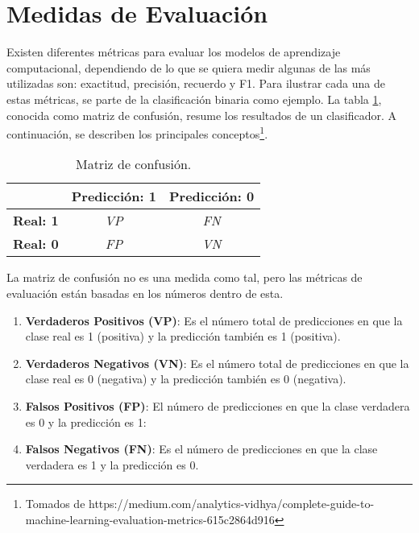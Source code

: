 \section{Medidas de Evaluación}

Existen diferentes métricas para evaluar los modelos de aprendizaje computacional, dependiendo de lo que se quiera medir algunas de las más utilizadas son: exactitud, precisión, recuerdo y F1. Para ilustrar cada una de estas métricas, se parte de la clasificación binaria como ejemplo. La tabla \ref{table:confusion}, conocida como matriz de confusión, resume los resultados de un clasificador. A continuación, se describen los principales conceptos\footnote{Tomados de https://medium.com/analytics-vidhya/complete-guide-to-machine-learning-evaluation-metrics-615c2864d916}.

\begin{table}[ht]
\caption{Matriz de confusión.}
\label{table:confusion} 
\centering 
\begin{small}
\begin{tabular}{l|c|c|}
\cline{2-3}
                                         & \multicolumn{1}{l|}{\textbf{Predicción: 1}} & \multicolumn{1}{l|}{\textbf{Predicción: 0}} \\ \hline
\multicolumn{1}{|l|}{\textbf{Real: 1}} & \textit{VP}                                 & \textit{FN}                                 \\ \hline
\multicolumn{1}{|l|}{\textbf{Real: 0}} & \textit{FP}                                 & \textit{VN}                                 \\ \hline
\end{tabular}
\end{small}
\end{table}


La matriz de confusión no es una medida como tal, pero las métricas de evaluación están basadas en los números dentro de esta.



\begin{enumerate}
    \item \textbf{Verdaderos Positivos (VP)}: Es el número total de predicciones en que la clase real es 1 (positiva) y la predicción también es 1 (positiva).
    \item \textbf{Verdaderos Negativos (VN)}: Es el número total de predicciones en que la clase real es 0 (negativa) y la predicción también es 0 (negativa).
    \item \textbf{Falsos Positivos (FP)}: El número de predicciones en que la clase verdadera es 0 y la predicción es 1:
    \item \textbf{Falsos Negativos (FN)}: Es el número de predicciones en que la clase verdadera es 1 y la predicción es 0.
\end{enumerate}

